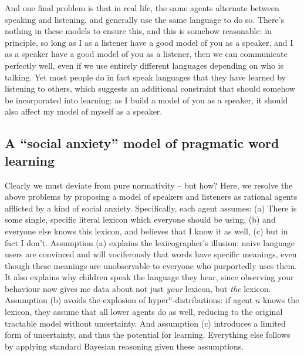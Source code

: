 \documentclass{article} %
\begin{document}
And one final problem is that in real life, the same agents alternate between speaking and listening, and generally use the same language to do so. There's nothing in these models to ensure this, and this is somehow reasonable: in principle, so long as I as a listener have a good model of you as a speaker, and I as a speaker have a good model of you as a listener, then we can communicate perfectly well, even if we use entirely different languages depending on who is talking. Yet most people do in fact speak languages that they have learned by listening to others, which suggests an additional constraint that should somehow be incorporated into learning: as I build a model of you as a speaker, it should also affect my model of myself as a speaker.

\subsection{A ``social anxiety'' model of pragmatic word learning}

Clearly we must deviate from pure normativity -- but how? Here, we resolve the above problems by proposing a model of speakers and listeners as rational agents afflicted by a kind of social anxiety. Specifically, each agent assumes: (a) There is some single, specific literal lexicon which everyone should be using, (b) and everyone else knows this lexicon, and believes that I know it as well, (c) but in fact I don't. Assumption (a) explains the lexicographer's illusion: naive language users are convinced and will vociferously that words have specific meanings, even though these meanings are unobservable to everyone who purportedly uses them. It also explains why children speak the language they hear, since observing your behaviour now gives me data about not just \textit{your} lexicon, but \textit{the} lexicon. Assumption (b) avoids the explosion of hyper$^n$-distributions: if agent $n$ knows the lexicon, they assume that all lower agents do as well, reducing to the original tractable model without uncertainty. And assumption (c) introduces a limited form of uncertainty, and thus the potential for learning. Everything else follows by applying standard Bayesian reasoning given these assumptions.
\end{document}
